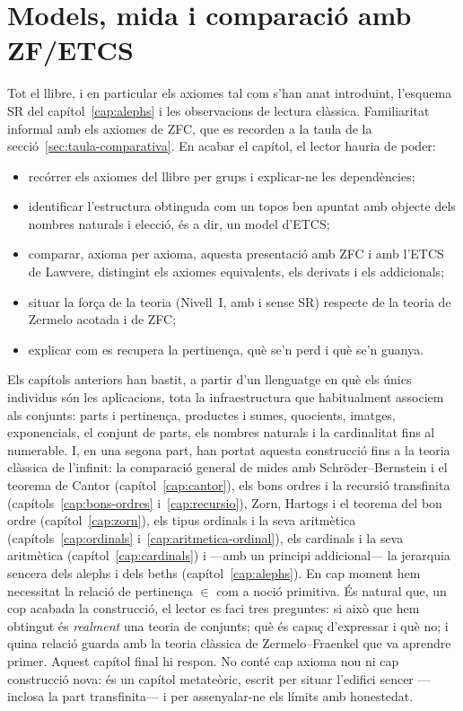 \chapter{Models, mida i comparació amb \texorpdfstring{ZF\slash ETCS}{ZF/ETCS}}\label{cap:models}

\begin{objectius}
 Tot el llibre, i en particular els axiomes tal com s'han anat introduint, l'esquema SR del capítol~\ref{cap:alephs} i les observacions de lectura clàssica. Familiaritat informal amb els axiomes de ZFC, que es recorden a la taula de la secció~\ref{sec:taula-comparativa}.
 En acabar el capítol, el lector hauria de poder:
\begin{itemize}
  \item recórrer els axiomes del llibre per grups i explicar-ne les dependències;
  \item identificar l'estructura obtinguda com un topos ben apuntat amb objecte dels nombres naturals i elecció, és a dir, un model d'ETCS;
  \item comparar, axioma per axioma, aquesta presentació amb ZFC i amb l'ETCS de Lawvere, distingint els axiomes equivalents, els derivats i els addicionals;
  \item situar la força de la teoria (Nivell~I, amb i sense SR) respecte de la teoria de Zermelo acotada i de ZFC;
  \item explicar com es recupera la pertinença, què se'n perd i què se'n guanya.
\end{itemize}
\end{objectius}

Els capítols anteriors han bastit, a partir d'un llenguatge en què els
únics individus són les aplicacions, tota la infraestructura que
habitualment associem als conjunts: parts i pertinença, productes i sumes,
quocients, imatges, exponencials, el conjunt de parts, els nombres
naturals i la cardinalitat fins al numerable. I, en una segona part, han
portat aquesta construcció fins a la teoria clàssica de l'infinit: la
comparació general de mides amb Schröder--Bernstein i el teorema de Cantor
(capítol~\ref{cap:cantor}), els bons ordres i la recursió transfinita
(capítols~\ref{cap:bons-ordres} i~\ref{cap:recursio}), Zorn, Hartogs i el
teorema del bon ordre (capítol~\ref{cap:zorn}), els tipus ordinals i la seva
aritmètica (capítols~\ref{cap:ordinals} i~\ref{cap:aritmetica-ordinal}), els
cardinals i la seva aritmètica (capítol~\ref{cap:cardinals}) i ---amb un principi
addicional--- la jerarquia sencera dels alephs i dels beths
(capítol~\ref{cap:alephs}). En cap
moment hem necessitat la relació de pertinença \(\in\) com a noció primitiva.
És natural que, un cop acabada la construcció, el lector es faci tres
preguntes: si això que hem obtingut és \emph{realment} una teoria de
conjunts; què és capaç d'expressar i què no; i quina relació guarda amb la
teoria clàssica de Zermelo--Fraenkel que va aprendre primer. Aquest capítol
final hi respon. No conté cap axioma nou ni cap construcció nova: és un
capítol metateòric, escrit per situar l'edifici sencer ---inclosa la part
transfinita--- i per assenyalar-ne els límits amb honestedat.


